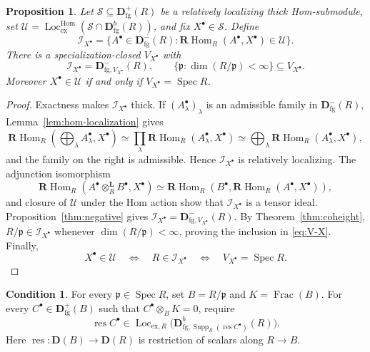 \documentclass[11pt]{amsart}
\numberwithin{equation}{section}
\newtheorem{proposition}[theorem]{Proposition}
\theoremstyle{definition}
\newtheorem{condition}[theorem]{Condition}
\theoremstyle{remark}
\DeclareMathOperator{\Supp}{Supp}
\DeclareMathOperator{\Spec}{Spec}
\DeclareMathOperator{\Loc}{Loc}
\DeclareMathOperator{\Hom}{Hom}
\DeclareMathOperator{\Frac}{Frac}
\DeclareMathOperator{\res}{res}
\newcommand{\RHom}{\mathbf R\!\Hom}
\newcommand{\Lotimes}{\otimes_R^{\mathbf L}}
\newcommand{\D}{\mathbf D}
\newcommand{\fg}{\mathrm{fg}}
\newcommand{\Lhom}{\Loc_{\mathrm{ex}}^{\Hom}}
\newcommand{\p}{\mathfrak p}
\begin{document}
\begin{proposition}\label{prop:I-X}
Let $\mathcal S\subseteq\D^+_{\fg}(R)$ be a relatively localizing thick
Hom-submodule, set $\mathcal U=\Lhom(\mathcal S\cap\D^b_{\fg}(R))$,
and fix $X^{\bullet}\in\mathcal S$. Define
\begin{equation}\label{eq:I-X}
 \mathcal I_{X^{\bullet}}=\{A^{\bullet}\in\D^-_{\fg}(R):\RHom_R(A^{\bullet},X^{\bullet})\in\mathcal U\}.
\end{equation}
There is a specialization-closed $V_{X^{\bullet}}$ with
\begin{equation}\label{eq:V-X}
 \mathcal I_{X^{\bullet}}=\D^-_{\fg,V_{X^{\bullet}}}(R),\qquad
 \{\p:\dim(R/\p)<\infty\}\subseteq V_{X^{\bullet}}.
\end{equation}
Moreover $X^{\bullet}\in\mathcal U$ if and only if $V_{X^{\bullet}}=\Spec R$.
\end{proposition}
\begin{proof}
Exactness makes $\mathcal I_{X^{\bullet}}$ thick. If
$(A_\lambda^{\bullet})_\lambda$ is an admissible family in
$\D^-_{\fg}(R)$, Lemma~\ref{lem:hom-localization} gives
\[
 \RHom_R\!\left(\bigoplus_\lambda A_\lambda^{\bullet},X^{\bullet}\right)
 \simeq\prod_\lambda\RHom_R(A_\lambda^{\bullet},X^{\bullet})
 \simeq\bigoplus_\lambda\RHom_R(A_\lambda^{\bullet},X^{\bullet}),
\]
and the family on the right is admissible. Hence
$\mathcal I_{X^{\bullet}}$ is relatively localizing. The adjunction
isomorphism
\[
 \RHom_R(A^{\bullet}\Lotimes B^{\bullet},X^{\bullet})\simeq\RHom_R(B^{\bullet},\RHom_R(A^{\bullet},X^{\bullet})),
\]
and closure of $\mathcal U$ under the Hom action show that
$\mathcal I_{X^{\bullet}}$ is a tensor ideal.
Proposition~\ref{thm:negative} gives
$\mathcal I_{X^{\bullet}}=\D^-_{\fg,V_{X^{\bullet}}}(R)$.
By Theorem~\ref{thm:coheight}, $R/\p\in\mathcal I_{X^{\bullet}}$ whenever
$\dim(R/\p)<\infty$, proving the inclusion in \eqref{eq:V-X}.
Finally,
\[
 X^{\bullet}\in\mathcal U
 \quad\Longleftrightarrow\quad
 R\in\mathcal I_{X^{\bullet}}
 \quad\Longleftrightarrow\quad
 V_{X^{\bullet}}=\Spec R.
\]
\end{proof}

\begin{condition}
\label{cond:torsion}
For every $\p\in\Spec R$, set $B=R/\p$ and $K=\Frac(B)$.
For every $C^{\bullet}\in\D^+_{\fg}(B)$ such that $C^{\bullet}\otimes_BK=0$, require
\begin{equation}\label{eq:domain-condition}
 \res C^{\bullet}\in\Loc_{\mathrm{ex},R}\bigl(\D^b_{\fg,\Supp_R(\res C^{\bullet})}(R)\bigr).
\end{equation}
Here $\res:\D(B)\to\D(R)$ is restriction of scalars along $R\to B$.
\end{condition}
\end{document}

